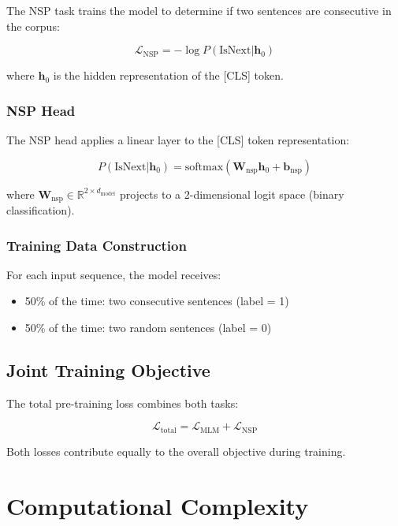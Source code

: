 \documentclass[11pt,a4paper]{article}
\begin{document}
The NSP task trains the model to determine if two sentences are consecutive in the corpus:

\begin{equation}
\mathcal{L}_{\text{NSP}} = -\log P(\text{IsNext} | \mathbf{h}_0)
\end{equation}

where $\mathbf{h}_0$ is the hidden representation of the [CLS] token.

\subsubsection{NSP Head}

The NSP head applies a linear layer to the [CLS] token representation:

\begin{equation}
P(\text{IsNext} | \mathbf{h}_0) = \text{softmax}(\mathbf{W}_{\text{nsp}}\mathbf{h}_0 + \mathbf{b}_{\text{nsp}})
\end{equation}

where $\mathbf{W}_{\text{nsp}} \in \mathbb{R}^{2 \times d_{\text{model}}}$ projects to a 2-dimensional logit space (binary classification).

\subsubsection{Training Data Construction}

For each input sequence, the model receives:
\begin{itemize}
    \item 50\% of the time: two consecutive sentences (label = 1)
    \item 50\% of the time: two random sentences (label = 0)
\end{itemize}

\subsection{Joint Training Objective}

The total pre-training loss combines both tasks:

\begin{equation}
\mathcal{L}_{\text{total}} = \mathcal{L}_{\text{MLM}} + \mathcal{L}_{\text{NSP}}
\end{equation}

Both losses contribute equally to the overall objective during training.

\section{Computational Complexity}
\end{document}
